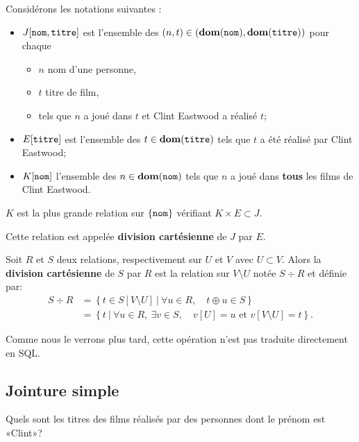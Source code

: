 Considérons les notations suivantes :
\begin{itemize}
\item  $J[\mathtt{nom}, \mathtt{titre}]$ est l'ensemble des $(n,t) \in (\mathbf{dom}(\mathtt{nom}),\mathbf{dom}(\mathtt{titre}))$ pour chaque 
  \begin{itemize}
    \item[\textbullet] $n$ nom d'une personne,
    \item[\textbullet] $t$ titre de film,
    \item[\textbullet] tels que $n$ a joué dans $t$ et Clint Eastwood a réalisé $t$;
  \end{itemize}
\item $E[\mathtt{titre}]$ est l'ensemble des $t \in \mathbf{dom}(\mathtt{titre})$ tels que $t$ a été réalisé par Clint Eastwood;
\item $K[\mathtt{nom}]$ l'ensemble des  $n \in \mathbf{dom}(\mathtt{nom})$ tels que $n$ a
  joué dans \textbf{tous} les films de Clint Eastwood.
\end{itemize}

$K$ est la plus grande relation sur $\left\{\mathtt{nom}\right\}$ vérifiant
$K\times E \subset J$.

Cette relation est appelée \textbf{division cartésienne} de $J$ par $E$.

\begin{defi}
  Soit $R$ et $S$ deux relations, respectivement sur $U$ et $V$ avec
  $U\subset V$. Alors la \textbf{division cartésienne} de $S$ par $R$
  est la relation sur $V\setminus U$ notée $S\div R$ et définie par:
  \begin{align*}
    S\div R
    &=  \left\{t  \in S[V\setminus U] ~|~ \forall u \in R, \quad t\oplus u \in S\right\}\\
    &= \left\{t ~|~ \forall u \in R,~ \exists v \in S, \quad v[U] = u \text{ et }
      v[V\setminus U]=t\right\}.
  \end{align*}
\end{defi}
Comme nous le verrons plus tard, cette opération n'est pas traduite directement en SQL.
\subsection{Jointure simple}

Quels sont les titres des films réalisés par des personnes dont le prénom est
«Clint»?

